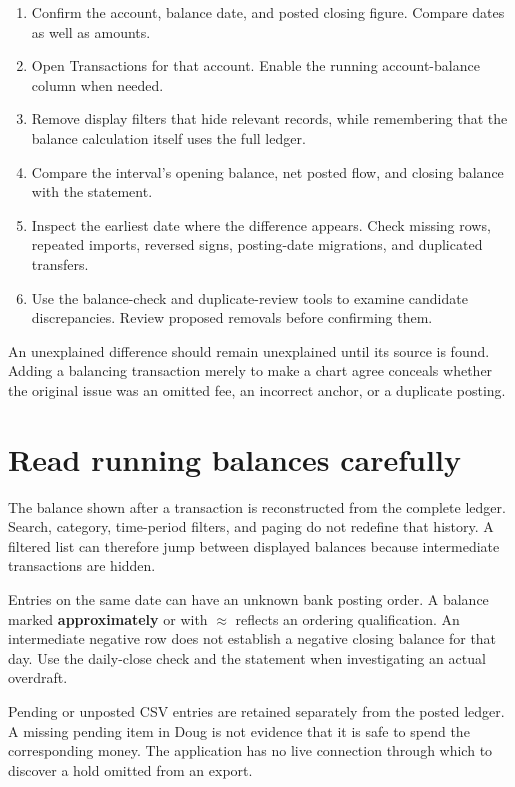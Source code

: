 \begin{enumerate}
\item Confirm the account, balance date, and posted closing figure. Compare dates as well as amounts.
\item Open Transactions for that account. Enable the running account-balance column when needed.
\item Remove display filters that hide relevant records, while remembering that the balance calculation itself uses the full ledger.
\item Compare the interval's opening balance, net posted flow, and closing balance with the statement.
\item Inspect the earliest date where the difference appears. Check missing rows, repeated imports, reversed signs, posting-date migrations, and duplicated transfers.
\item Use the balance-check and duplicate-review tools to examine candidate discrepancies. Review proposed removals before confirming them.
\end{enumerate}

An unexplained difference should remain unexplained until its source is found. Adding a balancing transaction merely to make a chart agree conceals whether the original issue was an omitted fee, an incorrect anchor, or a duplicate posting.

\section{Read running balances carefully}
The balance shown after a transaction is reconstructed from the complete ledger. Search, category, time-period filters, and paging do not redefine that history. A filtered list can therefore jump between displayed balances because intermediate transactions are hidden.

Entries on the same date can have an unknown bank posting order. A balance marked \textbf{approximately} or with \(\approx\) reflects an ordering qualification. An intermediate negative row does not establish a negative closing balance for that day. Use the daily-close check and the statement when investigating an actual overdraft.

Pending or unposted CSV entries are retained separately from the posted ledger. A missing pending item in Doug is not evidence that it is safe to spend the corresponding money. The application has no live connection through which to discover a hold omitted from an export.

